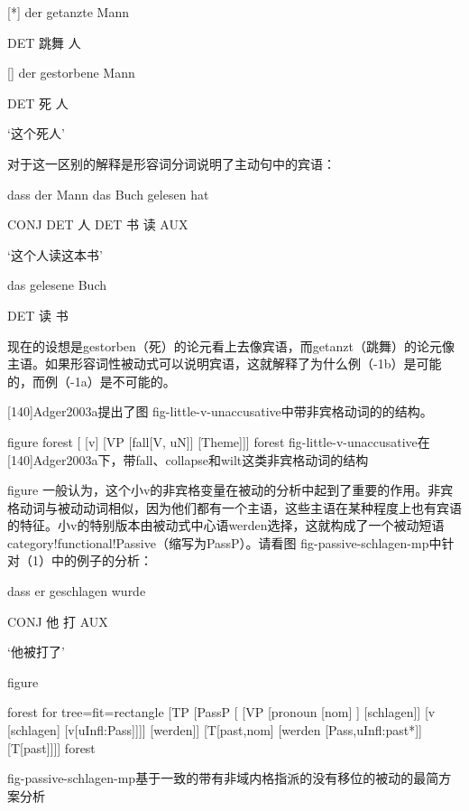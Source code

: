 [*]
der getanzte Mann

     DET 跳舞 人



[]
der gestorbene Mann

     DET 死 人

`这个死人'




对于这一区别的解释是形容词分词说明了主动句中的宾语：




dass der Mann das Buch gelesen hat

     CONJ DET 人  DET 书 读 AUX

`这个人读这本书'



das gelesene Buch

     DET 读 书



现在的设想是gestorben（死）的论元看上去像宾语，而getanzt（跳舞）的论元像主语。如果形容词性被动式可以说明宾语，这就解释了为什么例（-1b）是可能的，而例（-1a）是不可能的。





[140]Adger2003a提出了图 fig-little-v-unaccusative中带非宾格动词的的结构。

figure
forest
[
  [v]
  [VP
    [fall[V, uN]]
    [Theme]]]
forest
fig-little-v-unaccusative在[140]Adger2003a下，带fall、collapse和wilt这类非宾格动词的结构


figure
一般认为，这个小v的非宾格变量在被动的分析中起到了重要的作用。非宾格动词与被动动词相似，因为他们都有一个主语，这些主语在某种程度上也有宾语的特征。小v的特别版本由被动式中心语werden选择，这就构成了一个被动短语category!functional!Passive（缩写为PassP）。请看图 fig-passive-schlagen-mp中针对（1）中的例子的分析：






dass er geschlagen wurde

     CONJ 他 打 AUX

`他被打了'



figure


forest
for tree=fit=rectangle
[TP
     [PassP
       [
         [VP
           [pronoun [nom] ]
           [schlagen]]
         [v
           [schlagen]
           [v[uInfl:Pass]]]]
       [werden]]
     [T[past,nom]
       [werden [Pass,uInfl:past*]]
       [T[past]]]]
forest


fig-passive-schlagen-mp基于一致的带有非域内格指派的没有移位的被动的最简方案分析


